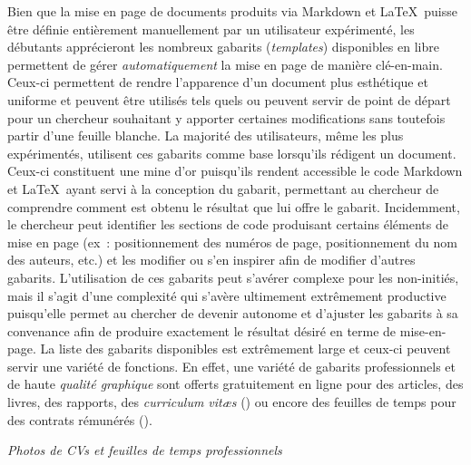 \documentclass[
  letterpaper,
]{scrbook}
\begin{document}
Bien que la mise en page de documents produits via Markdown et
\LaTeX~puisse être définie entièrement manuellement par un utilisateur
expérimenté, les débutants apprécieront les nombreux gabarits
(\emph{templates}) disponibles en libre permettent de gérer
\emph{automatiquement} la mise en page de manière clé-en-main. Ceux-ci
permettent de rendre l'apparence d'un document plus esthétique et
uniforme et peuvent être utilisés tels quels ou peuvent servir de point
de départ pour un chercheur souhaitant y apporter certaines
modifications sans toutefois partir d'une feuille blanche. La majorité
des utilisateurs, même les plus expérimentés, utilisent ces gabarits
comme base lorsqu'ils rédigent un document. Ceux-ci constituent une mine
d'or puisqu'ils rendent accessible le code Markdown et \LaTeX~ayant
servi à la conception du gabarit, permettant au chercheur de comprendre
comment est obtenu le résultat que lui offre le gabarit. Incidemment, le
chercheur peut identifier les sections de code produisant certains
éléments de mise en page (ex~: positionnement des numéros de page,
positionnement du nom des auteurs, etc.) et les modifier ou s'en
inspirer afin de modifier d'autres gabarits. L'utilisation de ces
gabarits peut s'avérer complexe pour les non-initiés, mais il s'agit
d'une complexité qui s'avère ultimement extrêmement productive
puisqu'elle permet au chercher de devenir autonome et d'ajuster les
gabarits à sa convenance afin de produire exactement le résultat désiré
en terme de mise-en-page. La liste des gabarits disponibles est
extrêmement large et ceux-ci peuvent servir une variété de fonctions. En
effet, une variété de gabarits professionnels et de haute \emph{qualité
graphique} sont offerts gratuitement en ligne pour des articles, des
livres, des rapports, des \emph{curriculum vitæs} () ou encore des
feuilles de temps pour des contrats rémunérés ().

\emph{Photos de CVs et feuilles de temps professionnels}
\end{document}
